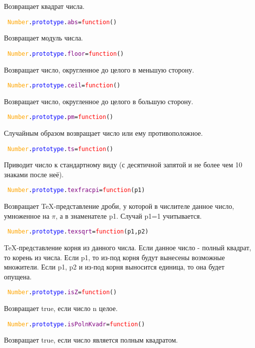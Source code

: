 Возвращает квадрат числа.

\texttt{
	\textcolor{Orange}{Number}.\textcolor{Blue}{prototype}.\textcolor{Purple}{abs}=\textcolor{Red}{function}()
}

Возвращает модуль числа.

\texttt{
	\textcolor{Orange}{Number}.\textcolor{Blue}{prototype}.\textcolor{Purple}{floor}=\textcolor{Red}{function}()
}

Возвращает число, округленное до целого в меньшую сторону.

\texttt{
	\textcolor{Orange}{Number}.\textcolor{Blue}{prototype}.\textcolor{Purple}{ceil}=\textcolor{Red}{function}()
}

Возвращает число, округленное до целого в большую сторону.

\texttt{
	\textcolor{Orange}{Number}.\textcolor{Blue}{prototype}.\textcolor{Purple}{pm}=\textcolor{Red}{function}()
}

Случайным образом возвращает число или ему противоположное.

\texttt{
	\textcolor{Orange}{Number}.\textcolor{Blue}{prototype}.\textcolor{Purple}{ts}=\textcolor{Red}{function}()
}

Приводит число к стандартному виду (с десятичной запятой и не более чем 10 знаками после неё).

\texttt{
	\textcolor{Orange}{Number}.\textcolor{Blue}{prototype}.\textcolor{Purple}{texfracpi}=\textcolor{Red}{function}(p1)
}

Возвращает TeX-представление дроби, у которой в числителе данное число, умноженное на $\pi$, а в знаменателе p1.
Случай p1=1 учитывается.

\texttt{
	\textcolor{Orange}{Number}.\textcolor{Blue}{prototype}.\textcolor{Purple}{texsqrt}=\textcolor{Red}{function}(p1,p2)
}

TeX-представление корня из данного числа.
Если данное число - полный квадрат, то корень из числа.
Если p1, то из-под корня будут вынесены возможные множители.
Если p1, p2 и из-под корня выносится единица, то она будет опущена.

\texttt{
	\textcolor{Orange}{Number}.\textcolor{Blue}{prototype}.\textcolor{Purple}{isZ}=\textcolor{Red}{function}()
}

Возвращает true, если число n целое.

\texttt{
	\textcolor{Orange}{Number}.\textcolor{Blue}{prototype}.\textcolor{Purple}{isPolnKvadr}=\textcolor{Red}{function}()
}

Возвращает true, если число является полным квадратом.

